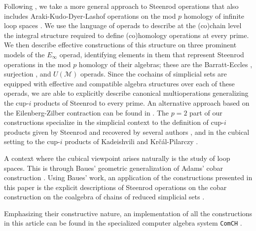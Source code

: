 Following \cite{may70generalapproach}, we take a more general approach to Steenrod operations that also includes Araki-Kudo-Dyer-Lashof operations on the mod $p$ homology of infinite loop spaces \cites{araki56squaring, dyer62lashof}.
We use the language of operads \cite{may72geometry} to describe at the (co)chain level the integral structure required to define (co)homology operations at every prime.
We then describe effective constructions of this structure on three prominent models of the $E_\infty$ operad, identifying elements in them that represent Steenrod operations in the mod $p$ homology of their algebras; these are the Barratt-Eccles \cite{berger04combinatorial}, surjection \cite{mcclure03cochain}, and $U(\mathcal M)$ \cite{medina2020prop1} operads.
Since the cochains of simplicial sets are equipped with effective and compatible algebra structures over each of these operads, we are able to explicitly describe canonical multioperations generalizing the \mbox{cup-$i$} products of Steenrod to every prime.
An alternative approach based on the Eilenberg-Zilber contraction can be found in \cite{gonzalez2005hpt}.
The $p = 2$ part of our constructions specialize in the simplicial context to the definition of cup-$i$ products given by Steenrod \cite{steenrod47products} and recovered by several authors \cites{mcclure03cochain, berger04combinatorial, medina2021newformulas}, and in the cubical setting to the cup-$i$ products of Kadeishvili \cite{kadeishvili1998dg} and Kr\v{c}\'{a}l-Pilarczy \cite{pilarczyk2016cubical}.

A context where the cubical viewpoint arises naturally is the study of loop spaces.
This is through Baues' geometric generalization of Adams' cobar construction \cite{baues1980geometry, adams1957cobar}.
Using Baues' work, an application of the constructions presented in this paper is the explicit descriptions of Steenrod operations on the cobar construction on the coalgebra of chains of reduced simplicial sets \cite{medina2021cobar}.

Emphasizing their constructive nature, an implementation of all the constructions in this article can be found in the specialized computer algebra system \texttt{ComCH} \cite{medina2021computer}.

